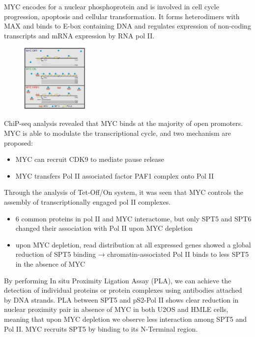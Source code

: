 MYC encodes for a nuclear phosphoprotein and is involved in cell cycle progression, apoptosis and cellular transformation. It forms heterodimers with MAX and binds to E-box containing DNA and regulates expression of non-coding transcripts and mRNA expression by RNA pol II.

\begin{figure}
\centering
\includegraphics[width=0.3\textwidth]{../_resources/Screenshot_2022-10-28_at_10-37-23.png}
\caption{}
\end{figure}

ChiP-seq analysis revealed that MYC binds at the majority of open promoters. MYC is able to modulate the transcriptional cycle, and two mechanism are
proposed:
\begin{itemize}
\tightlist
\item
  MYC can recruit CDK9 to mediate pause release
\item
  MYC transfers Pol II associated factor PAF1 complex onto Pol II
\end{itemize}

Through the analysis of Tet-Off/On system, it was seen that MYC controls the assembly of transcriptionally engaged pol II complexes.
\begin{itemize}
\tightlist
\item
  6 common proteins in pol II and MYC interactome, but only SPT5 and SPT6 changed their association with Pol II upon MYC depletion
\item
  upon MYC depletion, read distribution at all expressed genes showed a
  global reduction of SPT5 binding → chromatin-associated Pol II binds
  to less SPT5 in the absence of MYC
\end{itemize}

By performing In situ Proximity Ligation Assay (PLA), we can achieve the detection of individual proteins or protein complexes using antibodies attached by DNA strands. PLA between SPT5 and pS2-Pol II shows clear reduction in nuclear proximity pair in absence of MYC in both U2OS and HMLE cells, meaning that upon MYC depletion we observe less interaction among SPT5 and Pol II. MYC recruits SPT5 by binding to its N-Terminal region.

